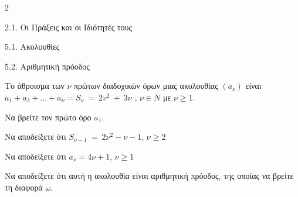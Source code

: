 \begin{ylh}{2}
    \item 2.1. Οι Πράξεις και οι Ιδιότητές τους
    \item 5.1. Ακολουθίες
    \item 5.2. Αριθμητική πρόοδος
\end{ylh}
Το άθροισμα των $\nu$ πρώτων διαδοχικών όρων μιας ακολουθίας $(a_{\nu})$ είναι $a_{1} + a_{2} + \ldots + a_{\nu} = S_{\nu}\  = \ 2v^{2}\  + \ 3\nu$ , $\nu \in N$ με $\nu \geq 1$.
\begin{alist}
\item Να βρείτε τον πρώτο όρο $a_{1}$.
\item Να αποδείξετε ότι $S_{\nu - 1}\  = \ 2\nu^{2} - \nu - 1$, $\nu \geq 2$
\item Να αποδείξετε ότι $a_{\nu} = 4\nu + 1$, $\nu \geq 1$
\item Να αποδείξετε ότι αυτή η ακολουθία είναι αριθμητική πρόοδος, της οποίας να βρείτε τη διαφορά $\omega$.

\end{alist}

